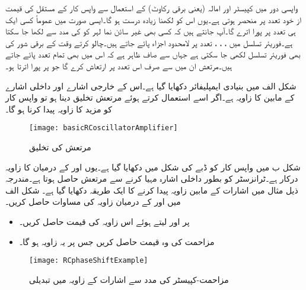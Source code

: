 واپسی دور میں کپیسٹر اور امالہ (یعنی برقی رکاوٹ) کے استعمال سے واپس کار کے مستقل کی قیمت از خود تعدد  پر منحصر ہوتی ہے۔یوں اس کو  لکھنا زیادہ درست ہو گا۔ایسی صورت میں     عموماً کسی ایک ہی تعدد پر پورا  اترے گا۔آپ جانتے ہیں کہ کسی بھی غیر سائن نما لہر کو  کی مدد سے لکھا جا سکتا ہے۔فوریئر تسلسل میں ، ، ،  تعدد پر لامحدود اجزاء پائے جاتے ہیں۔چالو کرتے وقت کے برقی شور کی بھی فوریئر تسلسل لکھی جا سکتی ہے جہاں سے صاف ظاہر ہے کہ اس میں بھی تمام تعدد پائے جاتے ہیں۔مرتعش ان میں سے صرف اس تعدد پر ارتعاش کرے گا جو  پر پورا اترتا ہو۔

شکل  الف میں بنیادی ایمپلیفائر دکھایا گیا ہے۔اس کے خارجی اشارے  اور داخلی اشارے  کے مابین  کا زاویہ ہے۔اگر اسے استعمال کرتے ہوئے مرتعش تخلیق دینا ہو تو واپس کار کو مزید  کا زاویہ پیدا کرنا ہو گا۔
\begin{figure}
\centering
\texttt{[image: basicRCoscillatorAmplifier]}
\caption{مرتعش کی تخلیق}
\label{شکل_مرتعش_کی_تخلیق}
\end{figure}
شکل  ب میں واپس کار کو ڈبے کی شکل میں دکھایا گیا ہے۔یوں  اور  کے درمیان  کا زاویہ درکار ہے۔ٹرانزسٹر کو   بطور داخلی اشارہ مہیا کرنے سے مرتعش حاصل ہوتا ہے۔مندرجہ ذیل مثال میں اشارات کے مابین زاویہ پیدا کرنے کا ایک طریقہ دکھایا گیا ہے۔
شکل  الف میں  اور  کے درمیان زاویہ کی مساوات حاصل کریں۔
\begin{itemize}
\item
{} پر اور  لیتے ہوئے اس زاویہ کی قیمت حاصل کریں۔
\item
مزاحمت  کی وہ قیمت حاصل کریں جس پر یہ زاویہ  ہو گا۔
\end{itemize}
%
\begin{figure}
\centering
\texttt{[image: RCphaseShiftExample]}
\caption{مزاحمت-کپیسٹر کی مدد سے اشارات کے زاویہ میں تبدیلی}
\label{شکل_مزاحمت_کپیسٹر_زاویہ_میں_تبدیلی}
\end{figure}

